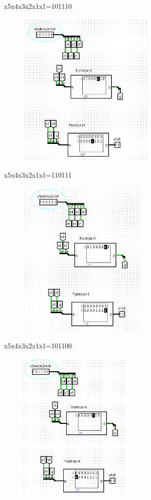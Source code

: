 \documentclass[]{article}
\begin{document}
x5x4x3x2x1x1=101110
\begin{figure}[H]
	\centering
	\includegraphics[width=0.60\textwidth]{1.7.png}
\end{figure}
x5x4x3x2x1x1=110111
\begin{figure}[H]
	\centering
	\includegraphics[width=0.57\textwidth]{1.8.png}
\end{figure}
x5x4x3x2x1x1=101100
\begin{figure}[H]
	\centering
	\includegraphics[width=0.50\textwidth]{1.9.png}
\end{figure}
\end{document}
